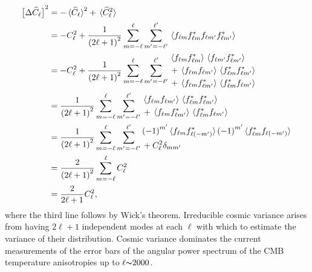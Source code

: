 \begin{align}
	\variance{\powerSpectrumHat}
	 & = - \expval*{\powerSpectrumHat}^{2} + \expval*{\powerSpectrumHat^{2}} \nonumber{}                                                                                                                     \\
	 & = - \powerSpectrum^{2} + \frac{1}{{(2\ell+1)}^{2}} \sum\limits_{m=-\ell}^{\ell} \sum\limits_{m'=-\ell'}^{\ell'} \expval*{\harmonic{f} \conj{\harmonic{f}} f_{\ell m'} \conj{f_{\ell m'}}} \nonumber{} \\
	 & = - \powerSpectrum^{2} + \frac{1}{{(2\ell+1)}^{2}} \sum\limits_{m=-\ell}^{\ell} \sum\limits_{m'=-\ell'}^{\ell'}
	\begin{aligned}
		 & \expval*{\harmonic{f} \conj{\harmonic{f}}}  \expval*{f_{\ell m'} \conj{f_{\ell m'}}} \nonumber{}  \\
		 & + \expval*{\harmonic{f} f_{\ell m'}} \expval*{\conj{\harmonic{f}} \conj{f_{\ell m'}}} \nonumber{} \\
		 & + \expval*{\harmonic{f} \conj{f_{\ell m'}}} \expval*{\conj{\harmonic{f}} f_{\ell m'}}
	\end{aligned} \nonumber{}                                          \\
	 & = \frac{1}{{(2\ell+1)}^{2}} \sum\limits_{m=-\ell}^{\ell} \sum\limits_{m'=-\ell'}^{\ell'}
	\begin{aligned}
		 & \expval*{\harmonic{f} f_{\ell m'}} \expval*{\conj{\harmonic{f}} \conj{f_{\ell m'}}} \nonumber{} \\
		 & + \expval*{\harmonic{f} \conj{f_{\ell m'}}} \expval*{\conj{\harmonic{f}} f_{\ell m'}}
	\end{aligned} \nonumber{}                                                                \\
	 & = \frac{1}{{(2\ell+1)}^{2}} \sum\limits_{m=-\ell}^{\ell} \sum\limits_{m'=-\ell'}^{\ell'}
	\begin{aligned}
		 & \phaseFactor['] \expval*{\harmonic{f} \conj{f_{\ell(-m')}}} \phaseFactor['] \expval*{\conj{\harmonic{f}} f_{\ell(-m')}} \nonumber{} \\
		 & + \powerSpectrum^{2} \delta_{m m'}
	\end{aligned} \nonumber{}                                \\
	 & = \frac{2}{{(2\ell+1)}^{2}} \sum\limits_{m=-\ell}^{\ell} \powerSpectrum^{2} \nonumber{}                                                                                                               \\
	 & = \frac{2}{2\ell+1} \powerSpectrum^{2},
\end{align}
%
where the third line follows by Wick's theorem.
Irreducible cosmic variance arises from having \(2\ell+1\) independent modes at each \(\ell{}\) with which to estimate the variance of their distribution.
Cosmic variance dominates the current measurements of the error bars of the angular power spectrum of the CMB temperature anisotropies up to \(\ell {\thicksim}\num{2000}\).

